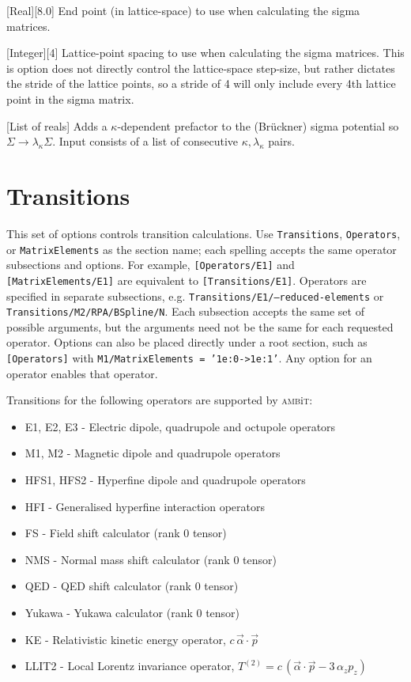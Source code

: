 \documentclass{report}
\newcommand{\ambit}{\textsc{amb}{\footnotesize i}\textsc{t}}
\begin{document}
[Real][8.0]{%
End point (in lattice-space) to use when calculating the sigma matrices.%
}

[Integer][4]{%
Lattice-point spacing to use when calculating the sigma matrices. This is option does not directly
control the lattice-space step-size, but rather dictates the stride of the lattice points, so a stride
of 4 will only include every 4th lattice point in the sigma matrix.%
}

[List of reals]{%
Adds a $\kappa$-dependent prefactor to the (Br\"{u}ckner) sigma potential so $\Sigma \to
\lambda_{\kappa}\Sigma$. Input consists of a list of consecutive $\kappa, \lambda_{\kappa}$ pairs.%
}



\section{Transitions}

This set of options controls transition calculations. Use \texttt{Transitions}, \texttt{Operators},
or \texttt{MatrixElements} as the section name; each spelling accepts the same operator subsections
and options. For example, \texttt{[Operators/E1]} and \texttt{[MatrixElements/E1]} are equivalent to
\texttt{[Transitions/E1]}. Operators are specified in separate subsections, e.g.
\texttt{Transitions/E1/--reduced-elements} or
\texttt{Transitions/M2/RPA/BSpline/N}. Each subsection accepts the same set 
of possible arguments, but the arguments need not be the same for each requested operator. 
Options can also be placed directly under a root section, such as \texttt{[Operators]} with
\texttt{M1/MatrixElements = '1e:0->1e:1'}. Any option for an operator enables that operator.

Transitions for the following operators are supported by \ambit:

\begin{itemize}
\item E1, E2, E3 - Electric dipole, quadrupole and octupole operators
\item M1, M2 - Magnetic dipole and quadrupole operators
\item HFS1, HFS2 - Hyperfine dipole and quadrupole operators
\item HFI - Generalised hyperfine interaction operators
\item FS - Field shift calculator (rank 0 tensor)
\item NMS - Normal mass shift calculator (rank 0 tensor)
\item QED - QED shift calculator (rank 0 tensor)
\item Yukawa - Yukawa calculator (rank 0 tensor)
\item KE - Relativistic kinetic energy operator, $c\,\vec{\alpha}\cdot\vec{p}$
\item LLIT2 - Local Lorentz invariance operator, $T^{(2)} = c\,(\vec{\alpha}\cdot\vec{p} - 3\,\alpha_z p_z)$
\end{itemize}
\end{document}
